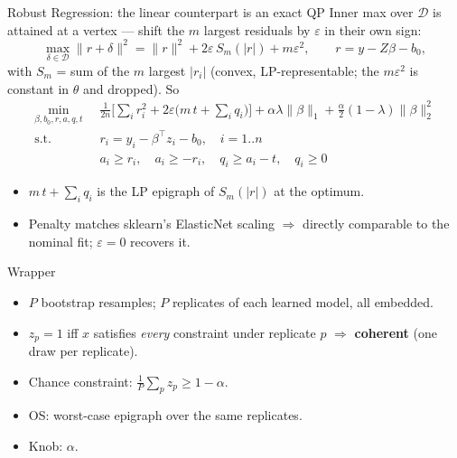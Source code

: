 \documentclass{beamer}
\begin{document}
\begin{frame}{Robust Regression: the linear counterpart is an exact QP}
  \small
  Inner max over $\mathcal D$ is attained at a vertex --- shift the $m$ largest
  residuals by $\varepsilon$ in their own sign:
  \[
    \max_{\delta\in\mathcal D}\lVert r+\delta\rVert^2
      = \lVert r\rVert^2 + 2\varepsilon\, S_m(|r|) + m\varepsilon^2,
    \qquad r = y - Z\beta - b_0,
  \]
  with $S_m$ = sum of the $m$ largest $|r_i|$ (convex, LP-representable; the
  $m\varepsilon^2$ is constant in $\theta$ and dropped). So
  \[
  \begin{aligned}
    \min_{\beta,b_0,r,a,q,t}\;\; & \tfrac{1}{2n}\Big[\textstyle\sum_i r_i^2
      + 2\varepsilon\big(m\,t + \sum_i q_i\big)\Big]
      + \alpha\lambda\lVert\beta\rVert_1
      + \tfrac{\alpha}{2}(1-\lambda)\lVert\beta\rVert_2^2 \\
    \text{s.t.}\;\; & r_i = y_i - \beta^\top z_i - b_0, \quad i=1..n \\
                    & a_i \ge r_i,\quad a_i \ge -r_i, \quad
                      q_i \ge a_i - t, \quad q_i \ge 0
  \end{aligned}
  \]
  \begin{itemize}
    \item $m\,t+\sum_i q_i$ is the LP epigraph of $S_m(|r|)$ at the optimum.
    \item Penalty matches sklearn's ElasticNet scaling $\Rightarrow$ directly comparable
      to the nominal fit; $\varepsilon=0$ recovers it.
  \end{itemize}
\end{frame}

\begin{frame}{Wrapper}
  \begin{itemize}
    \item $P$ bootstrap resamples; $P$ replicates of each learned model, all embedded.
    \item $z_p=1$ iff $x$ satisfies \emph{every} constraint under replicate $p$
      $\Rightarrow$ \textbf{coherent} (one draw per replicate).
    \item Chance constraint: $\tfrac1P\sum_p z_p \ge 1-\alpha$.
    \item OS: worst-case epigraph over the same replicates.
    \item Knob: $\alpha$.
  \end{itemize}
\end{frame}
\end{document}

